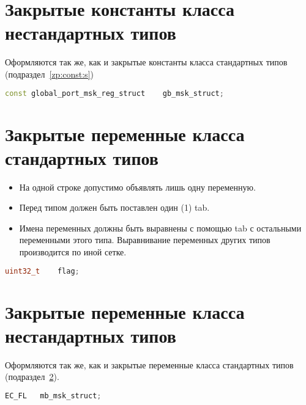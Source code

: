 \section{Закрытые константы класса нестандартных типов}\label{zp:const:n}
Оформляются так же, как и закрытые константы класса стандартных типов (подраздел~\ref{zp:const:s})\begin{lstlisting}[language=C++, frame=tlBR, basicstyle=\fontsize{10}{10}\ttfamily]
	const global_port_msk_reg_struct	gb_msk_struct;
\end{lstlisting}

\section{Закрытые переменные класса стандартных типов}\label{zp:pp:s}
\begin{itemize}
	\item На одной строке допустимо объявлять лишь одну переменную.
	\item Перед типом должен быть поставлен один (1) tab.
	\item Имена переменных должны быть выравнены с помощью tab с остальными переменными этого типа. Выравнивание переменных других типов производится по иной сетке.
\end{itemize}\begin{lstlisting}[language=C++, frame=tlBR, basicstyle=\fontsize{10}{10}\ttfamily]
	uint32_t	flag;
\end{lstlisting}

\section{Закрытые переменные класса нестандартных типов}\label{zp:pp:n}
Оформляются так же, как и закрытые переменные класса стандартных типов (подраздел~\ref{zp:pp:s}).\begin{lstlisting}[language=C++, frame=tlBR, basicstyle=\fontsize{10}{10}\ttfamily]
	EC_FL	mb_msk_struct;
\end{lstlisting}